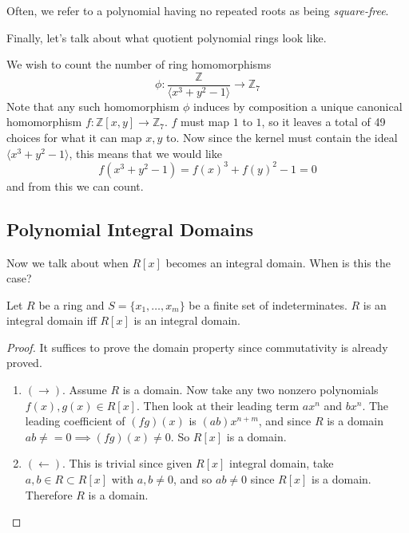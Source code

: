   Often, we refer to a polynomial having no repeated roots as being \textit{square-free}. 

  Finally, let's talk about what quotient polynomial rings look like. 

  \begin{example}
    We wish to count the number of ring homomorphisms 
    \begin{equation}
      \phi: \frac{\mathbb{Z}}{\langle x^3 + y^2 - 1 \rangle} \to \mathbb{Z}_7
    \end{equation}
    Note that any such homomorphism $\phi$ induces by composition a unique canonical homomorphism $f: \mathbb{Z}[x, y] \to \mathbb{Z}_7$. $f$ must map $1$ to $1$, so it leaves a total of 49 choices for what it can map $x, y$ to. Now since the kernel must contain the ideal $\langle x^3 + y^2 - 1 \rangle$, this means that we would like 
    \begin{equation}
      f(x^3 + y^2 - 1) = f(x)^3 + f(y)^2 - 1 = 0
    \end{equation}
    and from this we can count. 
  \end{example}

\subsection{Polynomial Integral Domains}

  Now we talk about when $R[x]$ becomes an integral domain. When is this the case? 

  \begin{theorem}
    Let $R$ be a ring and $S = \{x_1, \ldots, x_m\}$ be a finite set of indeterminates. $R$ is an integral domain iff $R[x]$ is an integral domain. 
  \end{theorem}
  \begin{proof}
    It suffices to prove the domain property since commutativity is already proved. 
    \begin{enumerate}
      \item $(\rightarrow)$. Assume $R$ is a domain. Now take any two nonzero polynomials $f(x), g(x) \in R[x]$. Then look at their leading term $ax^n$ and $bx^n$. The leading coefficient of $(fg)(x)$ is $(ab) x^{n+m}$, and since $R$ is a domain $ab \neq = 0 \implies (fg)(x) \neq 0$. So $R[x]$ is a domain. 
      \item $(\leftarrow)$. This is trivial since given $R[x]$ integral domain, take $a, b \in R \subset R[x]$ with $a, b \neq 0$, and so $ab \neq 0$ since $R[x]$ is a domain. Therefore $R$ is a domain. 
    \end{enumerate}
  \end{proof}


